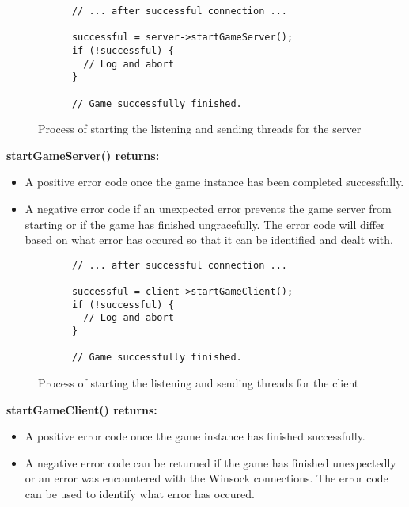 \begin{figure}[!h]
  \centering
  \begin{lstlisting}
      // ... after successful connection ...

      successful = server->startGameServer();
      if (!successful) {
        // Log and abort
      }

      // Game successfully finished.
  \end{lstlisting}
  \caption{Process of starting the listening and sending threads for the server}
  \label{code:server_game}
\end{figure}
\textbf{startGameServer() returns:}
\begin{itemize}
\item A positive error code once the game instance has been completed successfully.

\item A negative error code if an unexpected error prevents the game server from starting or if the game has finished ungracefully. The error code will differ based on what error has occured so that it can be identified and dealt with.
\end{itemize}


\begin{figure}[!h]
  \centering
  \begin{lstlisting}
      // ... after successful connection ...

      successful = client->startGameClient();
      if (!successful) {
        // Log and abort
      }

      // Game successfully finished.
  \end{lstlisting}
  \caption{Process of starting the listening and sending threads for the client}
  \label{code:client_game}
\end{figure}
\textbf{startGameClient() returns:}
\begin{itemize}
\item A positive error code once the game instance has finished successfully.

\item A negative error code can be returned if the game has finished unexpectedly or an error was encountered with the Winsock connections. The error code can be used to identify what error has occured.
\end{itemize}
